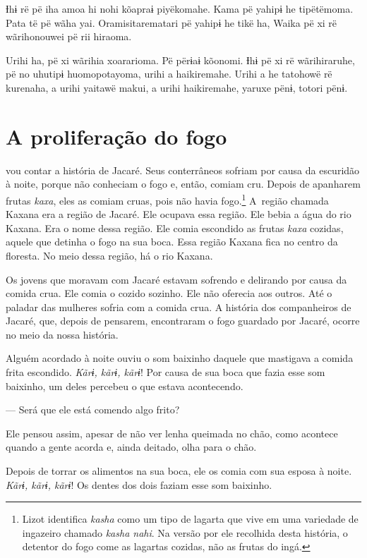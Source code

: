 Ɨhɨ rë pë iha amoa hi nohi kõapraɨ piyëkomahe. Kama pë yahipɨ he
tipëtëmoma. Pata të pë wãha yai. Oramisitarematari pë yahipɨ he tikë ha,
Waika pë xi rë wãrihonouwei pë rii hiraoma. 

Urihi ha, pë xi wãrihia xoararioma. Pë përɨaɨ kõonomi. Ɨhɨ pë xi rë
wãrihiraruhe, pë no uhutipɨ huomopotayoma, urihi a haikiremahe. Urihi a
he tatohowë rë kurenaha, a urihi yaitawë makui, a urihi haikiremahe,
yaruxe pënɨ, totori pënɨ. 

\chapter{A proliferação do fogo}

 vou contar a história de Jacaré. Seus conterrâneos sofriam por causa
da escuridão à noite, porque não conheciam o fogo e, então, comiam cru.
Depois de apanharem frutas \textit{kaxa}, eles as comiam cruas, pois não
havia fogo.\footnote{Lizot identifica \textit{kasha} como um tipo de lagarta que vive em uma variedade de ingazeiro chamado \textit{kasha nahi}. Na versão por ele recolhida desta história, o detentor do fogo come as lagartas cozidas, não as frutas do ingá.} A~região chamada Kaxana era a região de Jacaré. Ele ocupava
essa região. Ele bebia a água do rio Kaxana. Era o nome dessa região.
Ele comia escondido as frutas \textit{kaxa} cozidas, aquele que
detinha o fogo na sua boca. Essa região Kaxana fica no centro da
floresta. No meio dessa região, há o rio Kaxana.

Os jovens que moravam com Jacaré estavam sofrendo e delirando por causa
 da comida crua. Ele comia o cozido sozinho. Ele não oferecia aos outros. Até o
 paladar das mulheres sofria com a comida crua. A história dos
 companheiros de Jacaré, que, depois de pensarem, encontraram o fogo
 guardado por Jacaré, ocorre no meio da nossa história.

Alguém acordado à noite ouviu o som baixinho daquele que mastigava
a comida frita escondido. \textit{Kãrɨ, kãrɨ, kãrɨ}! Por causa de sua boca
que fazia esse som baixinho, um deles percebeu o que estava acontecendo. 

--- Será que ele está comendo algo frito?

Ele pensou assim, apesar de não ver lenha queimada no chão, como
acontece quando a gente acorda e, ainda deitado, olha para o chão. 

Depois de torrar os alimentos na sua boca, ele os comia com sua esposa à
 noite. \textit{Kãrɨ, kãrɨ, kãrɨ}! Os dentes dos dois faziam esse som
 baixinho. 


